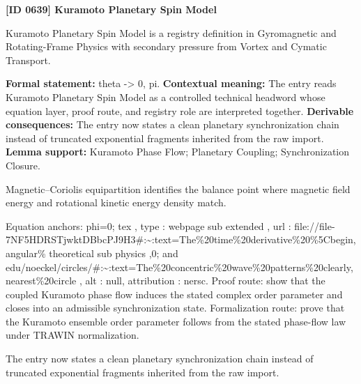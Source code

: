 \clearpage
\noindent\textbf{[ID 0639] Kuramoto Planetary Spin Model}\par
\vspace{0.35em}
\begingroup\small
{}
Kuramoto Planetary Spin Model is a registry definition in Gyromagnetic and Rotating-Frame Physics with secondary pressure from Vortex and Cymatic Transport.

\begingroup\footnotesize\setlength{\emergencystretch}{3em}\sloppy
\textbf{Formal statement:} theta -> 0, pi. \textbf{Contextual meaning:} The entry reads Kuramoto Planetary Spin Model as a controlled technical headword whose equation layer, proof route, and registry role are interpreted together. \textbf{Derivable consequences:} The entry now states a clean planetary synchronization chain instead of truncated exponential fragments inherited from the raw import. \textbf{Lemma support:} Kuramoto Phase Flow; Planetary Coupling; Synchronization Closure.\par
\endgroup

Magnetic--Coriolis equipartition identifies the balance point where magnetic field energy and rotational kinetic energy density match.

Equation anchors: phi=0; tex , type : webpage sub extended , url : file://file-7NF5HDRSTjwktDBbcPJ9H3\#:\textasciitilde{}:text=The\%20time\%20derivative\%20\%5Cbegin,angular\% theoretical sub physics ,0; and edu/noeckel/circles/\#:\textasciitilde{}:text=The\%20concentric\%20wave\%20patterns\%20clearly,nearest\%20circle , alt : null, attribution : nersc. Proof route: show that the coupled Kuramoto phase flow induces the stated complex order parameter and closes into an admissible synchronization state. Formalization route: prove that the Kuramoto ensemble order parameter follows from the stated phase-flow law under TRAWIN normalization.

The entry now states a clean planetary synchronization chain instead of truncated exponential fragments inherited from the raw import.
\endgroup

